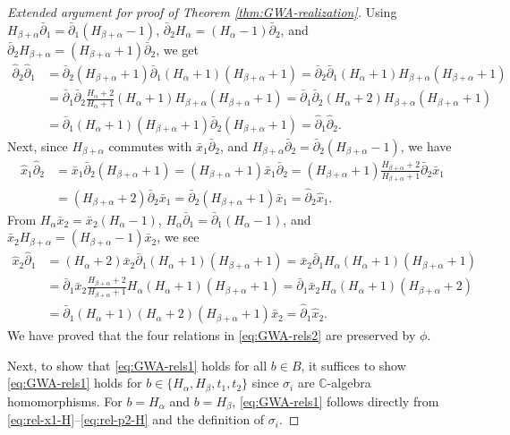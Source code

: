 \documentclass[pdftex]{sigma}
\numberwithin{equation}{section}
\begin{document}
\begin{proof}[Extended argument for proof of Theorem \ref{thm:GWA-realization}]
	Using $H_{\beta+\alpha}\bar{\partial}_1=\bar{\partial}_1(H_{\beta+\alpha}-1)$, $\bar{\partial}_2 H_\alpha=(H_\alpha-1)\bar{\partial}_2$, and $\bar{\partial}_2 H_{\beta+\alpha} = (H_{\beta+\alpha}+1)\bar{\partial}_2$, we get
	\begin{align*}
		\hat{\partial}_2\hat{\partial}_1 &= \bar{\partial}_2(H_{\beta+\alpha}+1)\bar{\partial}_1(H_\alpha+1)(H_{\beta+\alpha}+1)=\bar{\partial}_2\bar{\partial}_1(H_\alpha+1)H_{\beta+\alpha}(H_{\beta+\alpha}+1)\\
		&=\bar{\partial}_1\bar{\partial}_2\frac{H_\alpha+2}{H_\alpha+1}(H_\alpha+1)H_{\beta+\alpha}(H_{\beta+\alpha}+1)=
		\bar{\partial}_1\bar{\partial}_2(H_\alpha+2)H_{\beta+\alpha}(H_{\beta+\alpha}+1)\\
		&=\bar{\partial}_1 (H_\alpha+1)(H_{\beta+\alpha}+1)\bar{\partial}_2(H_{\beta+\alpha}+1)=\hat{\partial}_1\hat{\partial}_2.
	\end{align*}
	Next, since $H_{\beta+\alpha}$ commutes with $\bar{x}_1\bar{\partial}_2$, and $H_{\beta+\alpha}\bar{\partial}_2=\bar{\partial}_2(H_{\beta+\alpha}-1)$, we have
	\begin{align*}
		\hat{x}_1\hat{\partial}_2 &= \bar{x}_1\bar{\partial}_2(H_{\beta+\alpha}+1)=
		(H_{\beta+\alpha}+1)\bar{x}_1\bar{\partial}_2=
		(H_{\beta+\alpha}+1)\frac{H_{\beta+\alpha}+2}{H_{\beta+\alpha}+1}\bar{\partial}_2\bar{x}_1\\
		&=(H_{\beta+\alpha}+2)\bar{\partial}_2\bar{x}_1=\bar{\partial}_2(H_{\beta+\alpha}+1)\bar{x}_1=\hat{\partial}_2\hat{x}_1.
	\end{align*}
	From $H_\alpha\bar{x}_2=\bar{x}_2(H_\alpha-1)$, $H_\alpha\bar{\partial}_1=\bar{\partial}_1(H_\alpha-1)$, and $\bar{x}_2 H_{\beta+\alpha} = (H_{\beta+\alpha}-1)\bar{x}_2$, we see
	\begin{align*}
		\hat{x}_2\hat{\partial}_1&=(H_\alpha+2)\bar{x}_2\bar{\partial}_1(H_\alpha+1)(H_{\beta+\alpha}+1)=\bar{x}_2\bar{\partial}_1 H_\alpha (H_\alpha+1)(H_{\beta+\alpha}+1)\\
		&=\bar{\partial}_1\bar{x}_2\frac{H_{\beta+\alpha}+2}{H_{\beta+\alpha}+1}H_\alpha (H_\alpha+1)(H_{\beta+\alpha}+1)=
		\bar{\partial}_1\bar{x}_2 H_\alpha(H_\alpha+1)(H_{\beta+\alpha}+2)\\
		&=\bar{\partial}_1(H_\alpha+1)(H_\alpha+2)(H_{\beta+\alpha}+1)\bar{x}_2=\hat{\partial}_1\hat{x}_2.
	\end{align*}
	We have proved that the four relations in \eqref{eq:GWA-rels2} are preserved by $\phi$.
	
	Next, to show that \eqref{eq:GWA-rels1} holds for all $b\in B$, it suffices to show \eqref{eq:GWA-rels1} holds for $b\in\{H_\alpha, H_\beta, t_1, t_2\}$ since $\sigma_i$ are $\mathbb{C}$-algebra homomorphisms.
	For $b=H_\alpha$ and $b=H_\beta$, \eqref{eq:GWA-rels1} follows directly from \eqref{eq:rel-x1-H}--\eqref{eq:rel-p2-H} and the definition of $\sigma_i$.
	

\end{proof}
\end{document}
